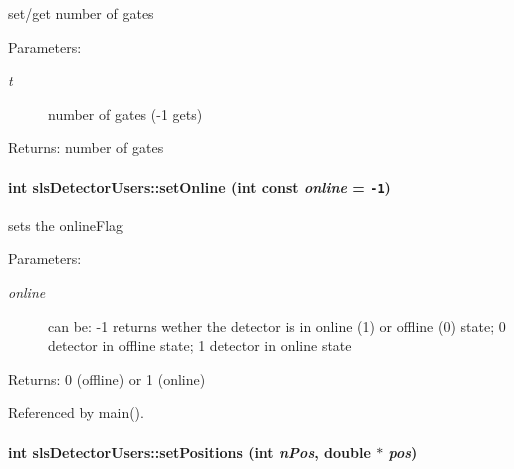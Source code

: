 set/get number of gates 

\begin{Desc}
\item[Parameters:]
\begin{description}
\item[{\em t}]number of gates (-1 gets) \end{description}
\end{Desc}
\begin{Desc}
\item[Returns:]number of gates \end{Desc}
\hypertarget{classslsDetectorUsers_ee622153ebd6b0dad065d95b07221955}{
\paragraph[setOnline]{\setlength{\rightskip}{0pt plus 5cm}int sls\-Detector\-Users::set\-Online (int const  {\em online} = {\tt -1})}\hfill}
\label{classslsDetectorUsers_ee622153ebd6b0dad065d95b07221955}


sets the online\-Flag 

\begin{Desc}
\item[Parameters:]
\begin{description}
\item[{\em online}]can be: -1 returns wether the detector is in online (1) or offline (0) state; 0 detector in offline state; 1 detector in online state \end{description}
\end{Desc}
\begin{Desc}
\item[Returns:]0 (offline) or 1 (online) \end{Desc}


Referenced by main().\hypertarget{classslsDetectorUsers_f296c05ee6134fb8d53d08a025e89775}{
\paragraph[setPositions]{\setlength{\rightskip}{0pt plus 5cm}int sls\-Detector\-Users::set\-Positions (int {\em n\-Pos}, double $\ast$ {\em pos})}\hfill}
\label{classslsDetectorUsers_f296c05ee6134fb8d53d08a025e89775}


